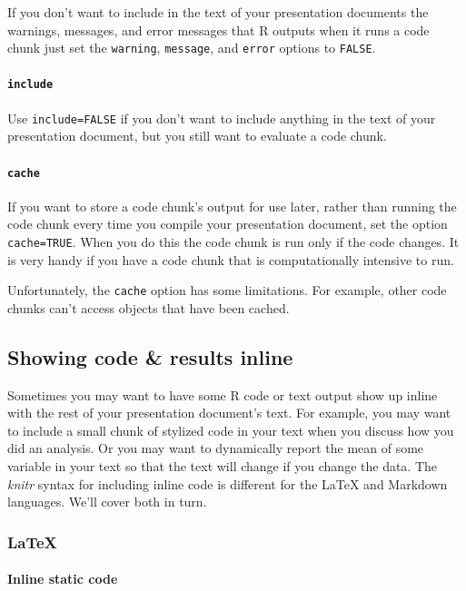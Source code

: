 If you don't want to include in the text of your presentation documents the warnings, messages, and error messages that R outputs when it runs a code chunk just set the \texttt{warning}, \texttt{message}, and \texttt{error} options to \texttt{FALSE}.

\paragraph{{\tt{include}}}

Use \texttt{include=FALSE} if you don't want to include anything in the text of your presentation document, but you still want to evaluate a code chunk.

\paragraph{{\tt{cache}}}

If you want to store a code chunk's output for use later, rather than running the code chunk every time you compile your presentation document, set the option \texttt{cache=TRUE}. When you do this the code chunk is run only if the code changes. It is very handy if you have a code chunk that is computationally intensive to run. 

Unfortunately, the \texttt{cache} option has some limitations. For example, other code chunks can't access objects that have been cached.

\subsection{Showing code \& results inline}

Sometimes you may want to have some R code or text output show up inline with the rest of your presentation document's text. For example, you may want to include a small chunk of stylized code in your text when you discuss how you did an analysis. Or you may want to dynamically report the mean of some variable in your text so that the text will change if you change the data. The {\emph{knitr}} syntax for including inline code is different for the LaTeX and Markdown languages. We'll cover both in turn.

\subsubsection{LaTeX}

\paragraph{Inline static code}

